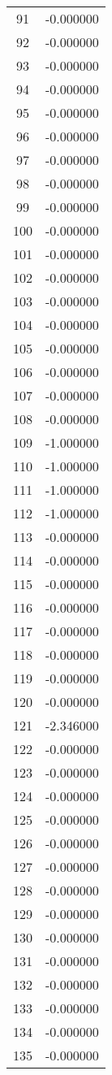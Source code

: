 \documentclass[12pt]{article}
\begin{document}
\begin{longtable}{@{}cc@{}}
91 & -0.000000 \\
92 & -0.000000 \\
93 & -0.000000 \\
94 & -0.000000 \\
95 & -0.000000 \\
96 & -0.000000 \\
97 & -0.000000 \\
98 & -0.000000 \\
99 & -0.000000 \\
100 & -0.000000 \\
101 & -0.000000 \\
102 & -0.000000 \\
103 & -0.000000 \\
104 & -0.000000 \\
105 & -0.000000 \\
106 & -0.000000 \\
107 & -0.000000 \\
108 & -0.000000 \\
109 & -1.000000 \\
110 & -1.000000 \\
111 & -1.000000 \\
112 & -1.000000 \\
113 & -0.000000 \\
114 & -0.000000 \\
115 & -0.000000 \\
116 & -0.000000 \\
117 & -0.000000 \\
118 & -0.000000 \\
119 & -0.000000 \\
120 & -0.000000 \\
121 & -2.346000 \\
122 & -0.000000 \\
123 & -0.000000 \\
124 & -0.000000 \\
125 & -0.000000 \\
126 & -0.000000 \\
127 & -0.000000 \\
128 & -0.000000 \\
129 & -0.000000 \\
130 & -0.000000 \\
131 & -0.000000 \\
132 & -0.000000 \\
133 & -0.000000 \\
134 & -0.000000 \\
135 & -0.000000 \\

\end{longtable}
\end{document}
